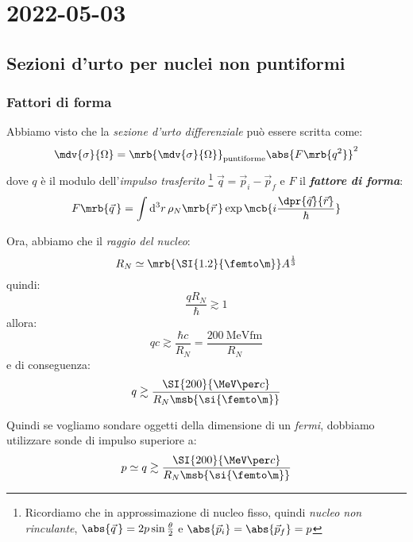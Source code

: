 \chapter{2022-05-03}
\section{Sezioni d'urto per nuclei non puntiformi}
\subsection{Fattori di forma}
Abbiamo visto che la \textit{sezione d'urto differenziale} può essere scritta
come:
\begin{equation}
  \mdv{\sigma}{\Omega} = \mrb{\mdv{\sigma}{\Omega}}_\text{puntiforme} \abs{F
  \mrb{q^2}}^{2}
\end{equation}
dove $q$ è il modulo dell'\textit{impulso trasferito} \footnote{
  Ricordiamo che in approssimazione di nucleo fisso, quindi \textit{nucleo non
  rinculante}, $\abs{\vec{q}\,} = 2p \sin \frac{\theta}{2}$ e
  $\abs{\vec{p}_{i}} = \abs{\vec{p}_{f}} = p$
} $\vec{q} = \vec{p}_{i} - \vec{p}_{f}$ e
$F$ il \textit{\textbf{fattore di forma}}:
\begin{equation}
  F \mrb{\vec{q}\,} = \int \mathrm{d}^{3} r \, \rho_N \mrb{\vec{r}\,} \exp
  \mcb{i \frac{\dpr{\vec{q}}{\vec{r}}}{\hbar}}
\end{equation}

Ora, abbiamo che il \textit{raggio del nucleo}:
\begin{equation}
  R _{N} \simeq \mrb{\SI{1.2}{\femto\m}} A ^{\frac{1}{3}}
\end{equation}
quindi:
\begin{equation}
  \frac{q R_N}{\hbar} \gtrsim 1
\end{equation}
allora:
\begin{equation}
  qc \gtrsim \frac{\hbar c}{R_N} = \frac{\SI{200}{\MeV \femto\m}}{R_N}
\end{equation}
e di conseguenza:
\begin{equation}
  q \gtrsim \frac{\SI{200}{\MeV \per c}}{R_N \msb{\si{\femto\m}}}
\end{equation}

Quindi se vogliamo sondare oggetti della dimensione di un \textit{fermi},
dobbiamo utilizzare sonde di impulso superiore a:
\begin{equation}
  p \simeq q \gtrsim \frac{\SI{200}{\MeV \per c}}{R_N \msb{\si{\femto\m}}}
\end{equation}

